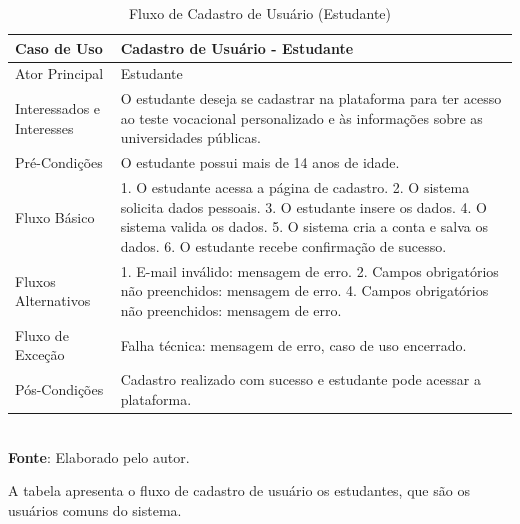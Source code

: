 \begin{table}[h!]
\centering
\caption{Fluxo de Cadastro de Usuário (Estudante)}
\begin{tabular}{|m{4cm}|m{11cm}|}
\hline
\textbf{Caso de Uso}   & \textbf{Cadastro de Usuário - Estudante} \\
\hline
Ator Principal & Estudante\\
\hline
Interessados e Interesses & O estudante deseja se cadastrar na plataforma para ter acesso ao teste vocacional personalizado e às informações sobre as universidades públicas. \\
\hline
Pré-Condições & O estudante possui mais de 14 anos de idade. \\
\hline
Fluxo Básico & 

1. O estudante acessa a página de cadastro.
2. O sistema solicita dados pessoais.
3. O estudante insere os dados.
4. O sistema valida os dados.
5. O sistema cria a conta e salva os dados.
6. O estudante recebe confirmação de sucesso.
\\
\hline
Fluxos Alternativos & 

1. E-mail inválido: mensagem de erro.
2. Campos obrigatórios não preenchidos: mensagem de erro.
4. Campos obrigatórios não preenchidos: mensagem de erro.
\\
\hline
Fluxo de Exceção & Falha técnica: mensagem de erro, caso de uso encerrado. \\
\hline
Pós-Condições & Cadastro realizado com sucesso e estudante pode acessar a plataforma. \\
\hline
\end{tabular}
\label{table:casos-de-uso}
\\[1ex]
\footnotesize \textbf{Fonte}: Elaborado pelo autor.
\end{table}

A tabela apresenta o fluxo de cadastro de usuário os estudantes, que são os usuários comuns do sistema.
\newpage

